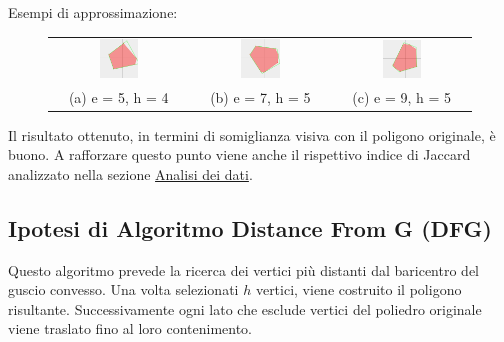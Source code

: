 \begin{center}
    Esempi di approssimazione:
\end{center}
\begin{figure}[H]
    \centering
    \begin{tabular}{ccc}
        \includegraphics[width=0.3\textwidth]{media/CuttingLargerAngle2/5_4.png} &
        \includegraphics[width=0.3\textwidth]{media/CuttingLargerAngle2/7_5.png} &
        \includegraphics[width=0.3\textwidth]{media/CuttingLargerAngle2/9_5.png} \\
        (a) e = 5, h = 4 & (b) e = 7, h = 5 & (c) e = 9, h = 5
    \end{tabular}
\end{figure}

Il risultato ottenuto, in termini di somiglianza visiva con il poligono originale, è buono. 
A rafforzare questo punto viene anche il rispettivo indice di Jaccard analizzato nella sezione 
\hyperref[sec:Analisi dei dati]{Analisi dei dati}.

\pagebreak
\subsection{Ipotesi di Algoritmo Distance From G (DFG)}

Questo algoritmo prevede la ricerca dei vertici più distanti dal baricentro del guscio convesso. 
Una volta selezionati $h$ vertici, viene costruito il poligono risultante.
Successivamente ogni lato che esclude vertici del poliedro originale viene traslato fino al 
loro contenimento.\\


